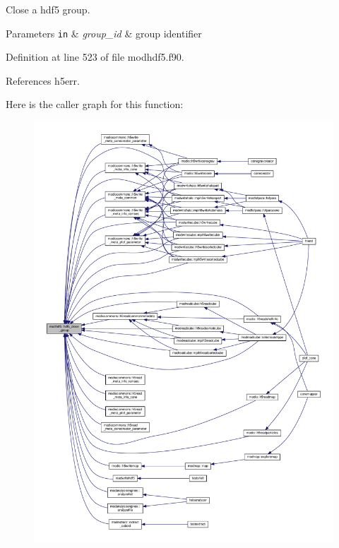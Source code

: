 Close a hdf5 group. 


\begin{DoxyParams}[1]{Parameters}
\mbox{\tt in}  & {\em group\+\_\+id} & group identifier \\
\hline
\end{DoxyParams}


Definition at line 523 of file modhdf5.\+f90.



References h5err.



Here is the caller graph for this function\+:\nopagebreak
\begin{figure}[H]
\begin{center}
\leavevmode
\includegraphics[width=350pt]{namespacemodhdf5_aba547bfdd3dc38385069b0885ab5d526_icgraph}
\end{center}
\end{figure}


